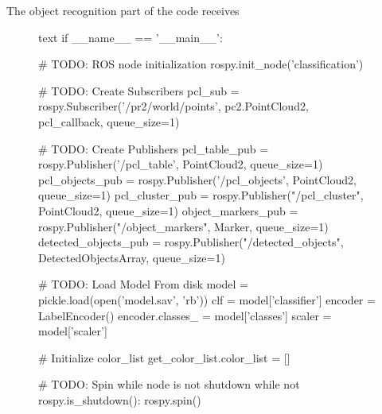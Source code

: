 \documentclass[a4paper]{article}
\begin{document}
The object recognition part of the code receives 
\begin{figure}[h]\scriptsize
\begin{sexylisting}{text}
if __name__ == '__main__':

    # TODO: ROS node initialization
    rospy.init_node('classification')

    # TODO: Create Subscribers
    pcl_sub = rospy.Subscriber('/pr2/world/points', pc2.PointCloud2, pcl_callback, queue_size=1)

    # TODO: Create Publishers
    pcl_table_pub = rospy.Publisher('/pcl_table', PointCloud2, queue_size=1)
    pcl_objects_pub = rospy.Publisher('/pcl_objects', PointCloud2, queue_size=1)
    pcl_cluster_pub = rospy.Publisher("/pcl_cluster", PointCloud2, queue_size=1)
    object_markers_pub = rospy.Publisher("/object_markers", Marker, queue_size=1)
    detected_objects_pub = rospy.Publisher("/detected_objects",
						 DetectedObjectsArray, queue_size=1)

    # TODO: Load Model From disk
    model = pickle.load(open('model.sav', 'rb'))
    clf = model['classifier']
    encoder = LabelEncoder()
    encoder.classes_ = model['classes']
    scaler = model['scaler']

    # Initialize color_list
    get_color_list.color_list = []

    # TODO: Spin while node is not shutdown
    while not rospy.is_shutdown():
        rospy.spin()
\end{sexylisting}
\end{figure}
\end{document}
